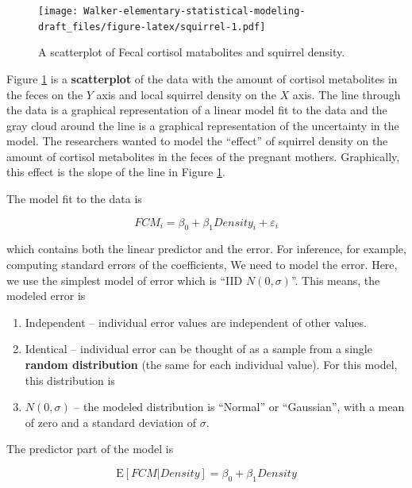 \documentclass[]{book}
\providecommand{\tightlist}{%
  \setlength{\itemsep}{0pt}\setlength{\parskip}{0pt}}
\begin{document}
\begin{figure}
\centering
\texttt{[image: Walker-elementary-statistical-modeling-draft\_files/figure-latex/squirrel-1.pdf]}
\caption{\label{fig:squirrel}A scatterplot of Fecal cortisol matabolites and
squirrel density.}
\end{figure}

Figure \ref{fig:squirrel} is a \textbf{scatterplot} of the data with the
amount of cortisol metabolites in the feces on the \(Y\) axis and local
squirrel density on the \(X\) axis. The line through the data is a
graphical representation of a linear model fit to the data and the gray
cloud around the line is a graphical representation of the uncertainty
in the model. The researchers wanted to model the ``effect'' of squirrel
density on the amount of cortisol metabolites in the feces of the
pregnant mothers. Graphically, this effect is the slope of the line in
Figure \ref{fig:squirrel}.

The model fit to the data is

\begin{equation}
FCM_i = \beta_0 + \beta_1 Density_i + \varepsilon_i
\label{eq:fcm-model}
\end{equation}

which contains both the linear predictor and the error. For inference,
for example, computing standard errors of the coefficients, We need to
model the error. Here, we use the simplest model of error which is ``IID
\(N(0, \sigma)\)''. This means, the modeled error is

\begin{enumerate}
\def\labelenumi{\arabic{enumi}.}
\tightlist
\item
  Independent -- individual error values are independent of other
  values.
\item
  Identical -- individual error can be thought of as a sample from a
  single \textbf{random distribution} (the same for each individual
  value). For this model, this distribution is
\item
  \(N(0, \sigma)\) -- the modeled distribution is ``Normal'' or
  ``Gaussian'', with a mean of zero and a standard deviation of
  \(\sigma\).
\end{enumerate}

The predictor part of the model is

\begin{equation}
\textrm{E}[FCM|Density] = \beta_0 + \beta_1 Density
\label{eq:regression}
\end{equation}
\end{document}
